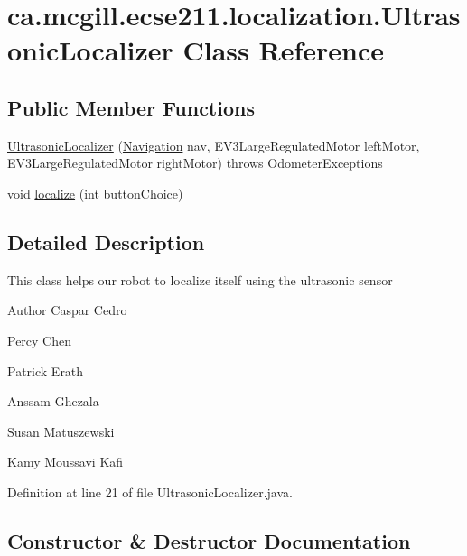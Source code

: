 \hypertarget{classca_1_1mcgill_1_1ecse211_1_1localization_1_1_ultrasonic_localizer}{}\section{ca.\+mcgill.\+ecse211.\+localization.\+Ultrasonic\+Localizer Class Reference}
\label{classca_1_1mcgill_1_1ecse211_1_1localization_1_1_ultrasonic_localizer}
\subsection*{Public Member Functions}
\begin{DoxyCompactItemize}
\item 
\hyperlink{classca_1_1mcgill_1_1ecse211_1_1localization_1_1_ultrasonic_localizer_a3603202cdb5035c4e4164933b0aebeec}{Ultrasonic\+Localizer} (\hyperlink{classca_1_1mcgill_1_1ecse211_1_1project_1_1_navigation}{Navigation} nav, E\+V3\+Large\+Regulated\+Motor left\+Motor, E\+V3\+Large\+Regulated\+Motor right\+Motor)  throws Odometer\+Exceptions 
\item 
void \hyperlink{classca_1_1mcgill_1_1ecse211_1_1localization_1_1_ultrasonic_localizer_ab78196997d7409aec0c35603686989ad}{localize} (int button\+Choice)
\end{DoxyCompactItemize}


\subsection{Detailed Description}
This class helps our robot to localize itself using the ultrasonic sensor

\begin{DoxyAuthor}{Author}
Caspar Cedro 

Percy Chen 

Patrick Erath 

Anssam Ghezala 

Susan Matuszewski 

Kamy Moussavi Kafi 
\end{DoxyAuthor}


Definition at line 21 of file Ultrasonic\+Localizer.\+java.



\subsection{Constructor \& Destructor Documentation}
\mbox{\label{classca_1_1mcgill_1_1ecse211_1_1localization_1_1_ultrasonic_localizer_a3603202cdb5035c4e4164933b0aebeec}} 

